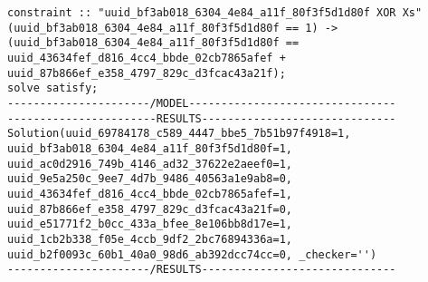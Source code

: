 \documentclass[11pt]{article}
\begin{document}
\begin{verbatim}
constraint :: "uuid_bf3ab018_6304_4e84_a11f_80f3f5d1d80f XOR Xs" (uuid_bf3ab018_6304_4e84_a11f_80f3f5d1d80f == 1) -> (uuid_bf3ab018_6304_4e84_a11f_80f3f5d1d80f == uuid_43634fef_d816_4cc4_bbde_02cb7865afef + uuid_87b866ef_e358_4797_829c_d3fcac43a21f);
solve satisfy;
----------------------/MODEL--------------------------------
-----------------------RESULTS------------------------------
Solution(uuid_69784178_c589_4447_bbe5_7b51b97f4918=1, uuid_bf3ab018_6304_4e84_a11f_80f3f5d1d80f=1, uuid_ac0d2916_749b_4146_ad32_37622e2aeef0=1, uuid_9e5a250c_9ee7_4d7b_9486_40563a1e9ab8=0, uuid_43634fef_d816_4cc4_bbde_02cb7865afef=1, uuid_87b866ef_e358_4797_829c_d3fcac43a21f=0, uuid_e51771f2_b0cc_433a_bfee_8e106bb8d17e=1, uuid_1cb2b338_f05e_4ccb_9df2_2bc76894336a=1, uuid_b2f0093c_60b1_40a0_98d6_ab392dcc74cc=0, _checker='')
----------------------/RESULTS------------------------------
\end{verbatim}
\end{document}
